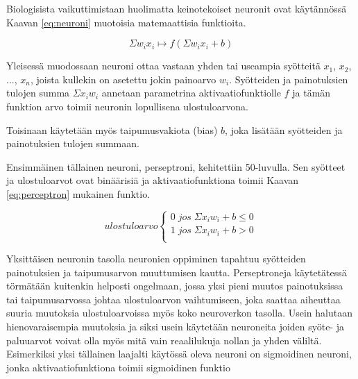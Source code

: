 \documentclass[11pt]{article}
\theoremstyle{plain}
\theoremstyle{definition}
\begin{document}
    Biologisista vaikuttimistaan huolimatta keinotekoiset neuronit ovat käytännössä Kaavan \ref{eq:neuroni} muotoisia matemaattisia funktioita.

    \begin{equation}
      \label{eq:neuroni}
      \Sigma w_i x_i \mapsto f(\Sigma w_i x_i + b)
    \end{equation}

    Yleisessä muodossaan neuroni ottaa vastaan yhden tai useampia syötteitä $x_1$, $x_2$, ..., $x_n$, joista kullekin on asetettu jokin painoarvo $w_i$. Syötteiden ja painotuksien tulojen summa $\Sigma x_i w_i$ annetaan parametrina aktivaatiofunktiolle $f$ ja tämän funktion arvo toimii neuronin lopullisena ulostuloarvona.

    Toisinaan käytetään myös taipumusvakiota (bias) $b$, joka lisätään syötteiden ja painotuksien tulojen summaan.



    Ensimmäinen tällainen neuroni, perseptroni, kehitettiin 50-luvulla. Sen syötteet ja ulostuloarvot ovat binäärisiä ja aktivaatiofunktiona toimii Kaavan \ref{eq:perceptron} mukainen funktio.

    \begin{equation}
      \label{eq:perceptron}
      ulostuloarvo
      \begin{cases}
        0\; jos \; \Sigma x_i w_i + b \leq 0 \\
        1\; jos \; \Sigma x_i w_i + b > 0 \\
      \end{cases}
    \end{equation}

    Yksittäisen neuronin tasolla neuronien oppiminen tapahtuu syötteiden painotuksien ja taipumusarvon muuttumisen kautta. Perseptroneja käytetätessä törmätään kuitenkin helposti ongelmaan, jossa yksi pieni muutos painotuksissa tai taipumusarvossa johtaa ulostuloarvon vaihtumiseen, joka saattaa aiheuttaa suuria muutoksia ulostuloarvoissa myös koko neuroverkon tasolla. Usein halutaan hienovaraisempia muutoksia ja siksi usein käytetään neuroneita joiden syöte- ja paluuarvot voivat olla myös mitä vain reaalilukuja nollan ja yhden väliltä. Esimerkiksi yksi tällainen laajalti käytössä oleva neuroni on sigmoidinen neuroni, jonka aktivaatiofunktiona toimii sigmoidinen funktio
\end{document}
